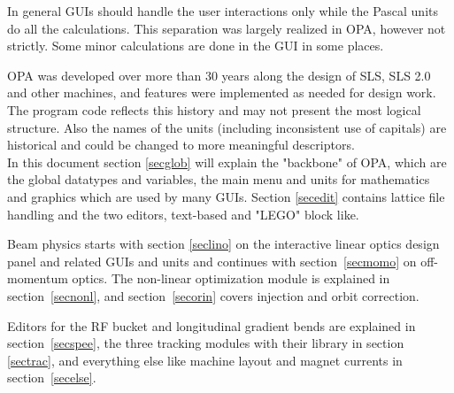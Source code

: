 \documentclass[12pt]{article}
\begin{document}
In general GUIs should handle the user interactions only while the Pascal units do all the calculations. This separation was largely realized in OPA, however not strictly. Some minor calculations are done in the GUI in some places.

OPA was developed over more than 30 years along the design of SLS, SLS 2.0 and other machines, and features were implemented as needed for design work. The program code reflects this history and may not present the most logical structure. Also the names of the units (including inconsistent use of capitals) are historical and could be changed to more meaningful descriptors.\\

In this document section \ref{secglob} will explain the "backbone" of OPA, which are the global datatypes and variables, the main menu and units for mathematics and graphics which are used by many GUIs. 
Section \ref{secedit} contains lattice file handling and the two editors, text-based and "LEGO" block like.

Beam physics starts with section \ref{seclino} on the interactive linear optics design panel and related GUIs and units and continues with section~\ref{secmomo} on off-momentum optics. The non-linear optimization module is explained in section~\ref{secnonl}, and section~\ref{secorin} covers injection and orbit correction.

Editors for the RF bucket and longitudinal gradient bends are explained in section~\ref{secspee}, the three tracking modules with their library in section \ref{sectrac}, and everything else like machine layout and magnet currents in section~\ref{secelse}.
\end{document}
